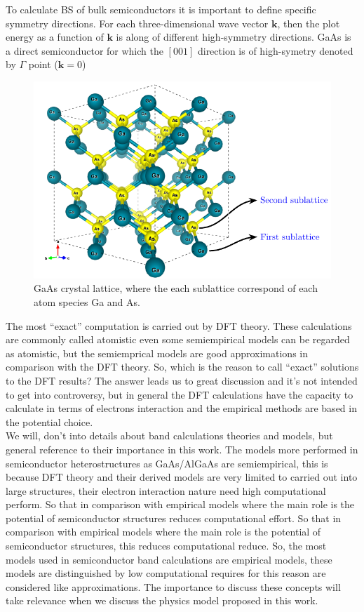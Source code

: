 To calculate \gls{BS} of bulk semiconductors it is important to define specific symmetry directions. For each three-dimensional wave vector $\boldsymbol{k}$, then the plot energy as a function of $\boldsymbol{k}$ is along of different high-symmetry directions\cite{piprek2017handbook}.  GaAs is a direct semiconductor for which the $\left[001\right]$ direction is of high-symetry denoted by $\Gamma$ point ($\boldsymbol{k}=0$)
\begin{figure}[h!]
	\centering
	\includegraphics[width=\linewidth]{../figures/chapter-1/bulk-1/build/bulk-1}
	\caption{
		 GaAs crystal lattice, where the each sublattice correspond of each atom species Ga and As. }
	\label{fig:subsubsection-1.1.1-bulk-1}
\end{figure}

The most ``exact'' computation is carried out by DFT theory. These calculations are  commonly  called atomistic even some  semiempirical models can be regarded as atomistic, but the semiemprical models are good approximations in comparison with the DFT theory. So, which is the reason to call ``exact'' solutions to the DFT results? The answer leads us to great discussion and  it's not intended to get into controversy,  but in general the DFT calculations have the capacity to calculate in terms of electrons interaction and the empirical methods are based in the potential choice.\\
 
We will, don’t into details about band calculations theories and models, but general reference to their  importance in this work. The models more performed in semiconductor heterostructures as GaAs/AlGaAs are semiempirical, this is because
\gls{DFT} theory and their derived models are very limited to carried out into large structures,
their electron interaction nature need high computational perform. So that in comparison
with empirical models where the main role is the potential of semiconductor structures  reduces computational effort. So that in comparison with empirical models where the main role is the potential of semiconductor structures, this reduces computational reduce. So, the most models used in semiconductor band calculations are empirical models, these models are distinguished by low computational requires for this reason are considered like approximations. The importance to discuss these concepts will take relevance when we discuss the physics model proposed in this work. 

